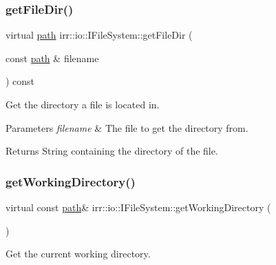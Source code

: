 \subsubsection{\texorpdfstring{get\+File\+Dir()}{getFileDir()}\hspace{0.1cm}{\footnotesize\ttfamily [2/2]}}
{\footnotesize\ttfamily virtual \hyperlink{namespaceirr_1_1io_a6468281622ce3a1c46b72e19f32dded5}{path} irr\+::io\+::\+I\+File\+System\+::get\+File\+Dir (\begin{DoxyParamCaption}\item[{const \hyperlink{namespaceirr_1_1io_a6468281622ce3a1c46b72e19f32dded5}{path} \&}]{filename }\end{DoxyParamCaption}) const\hspace{0.3cm}{\ttfamily [pure virtual]}}



Get the directory a file is located in. 


\begin{DoxyParams}{Parameters}
{\em filename} & The file to get the directory from. \\
\hline
\end{DoxyParams}
\begin{DoxyReturn}{Returns}
String containing the directory of the file. 
\end{DoxyReturn}
\mbox{\label{classirr_1_1io_1_1IFileSystem_acbf7342afa6e2fc9583db3e521e66e61}} 
\subsubsection{\texorpdfstring{get\+Working\+Directory()}{getWorkingDirectory()}\hspace{0.1cm}{\footnotesize\ttfamily [1/2]}}
{\footnotesize\ttfamily virtual const \hyperlink{namespaceirr_1_1io_a6468281622ce3a1c46b72e19f32dded5}{path}\& irr\+::io\+::\+I\+File\+System\+::get\+Working\+Directory (\begin{DoxyParamCaption}{ }\end{DoxyParamCaption})\hspace{0.3cm}{\ttfamily [pure virtual]}}



Get the current working directory. 

